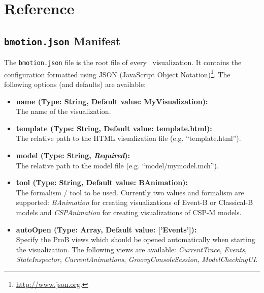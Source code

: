 \section{Reference}
\label{reference}

\subsection{\texttt{bmotion.json} Manifest}
\label{sec:manifest}

The \texttt{bmotion.json} file is the root file of every \bms\ visualization.
It contains the configuration formatted using JSON (JavaScript Object Notation)\footnote{\url{http://www.json.org}.}.
The following options (and defaults) are available:

\begin{itemize}
	\item[] \textbf{name (Type: String, Default value: MyVisualization):}\\The name of the visualization. 
	\item[] \textbf{template (Type: String, Default value: template.html):}\\The relative path to the HTML visualization file  (e.g. ``template.html'').
	\item[] \textbf{model (Type: String, \textit{Required}):}\\The relative path to the model file (e.g. ``model/mymodel.mch'').
	\item[] \textbf{tool (Type: String, Default value: BAnimation):}\\The formalism / tool to be used. Currently two values and formalism are supported: \textit{BAnimation} for creating visualizations of Event-B or Classical-B models and \textit{CSPAnimation} for creating visualizations of CSP-M models.
	\item[] \textbf{autoOpen (Type: Array, Default value: ['Events']):}\\Specify the ProB views which should be opened automatically when starting the visualization. 
The following views are available: \textit{CurrentTrace}, \textit{Events}, \textit{StateInspector}, \textit{CurrentAnimations}, \textit{GroovyConsoleSession}, \textit{ModelCheckingUI}.
\end{itemize}